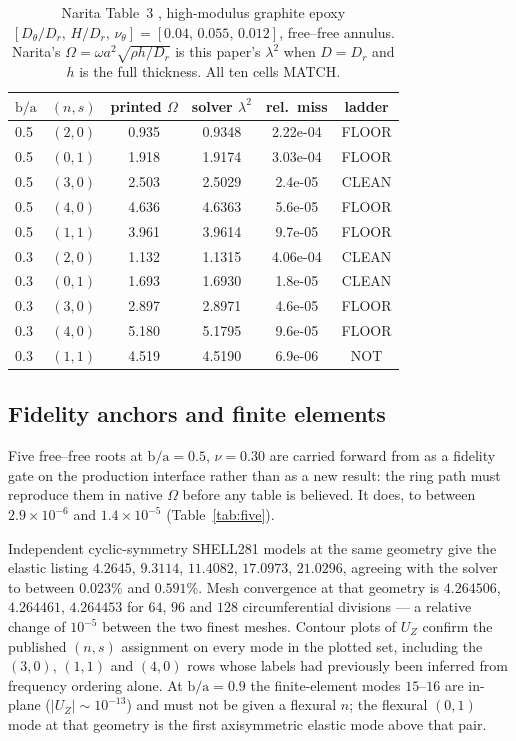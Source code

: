 \documentclass[11pt]{article}
\newcommand{\lamsq}{\lambda^{2}}
\newcommand{\ba}{\mbox{b/a}}
\begin{document}
\begin{table}[htbp]\centering\small
\caption{Narita Table~3 \cite{narita1984}, high-modulus graphite epoxy
$[D_\theta/D_r,\,H/D_r,\,\nu_\theta]=[0.04,\,0.055,\,0.012]$, free--free
annulus. Narita's $\Omega=\omega a^{2}\sqrt{\rho h/D_r}$ is this paper's
$\lamsq$ when $D=D_r$ and $h$ is the full thickness. All ten cells MATCH.}
\label{tab:narita3}
\begin{tabular}{lccccc}
\toprule
$\ba$ & $(n,s)$ & printed $\Omega$ & solver $\lamsq$ & rel.\ miss & ladder\\
\midrule
0.5 & $(2,0)$ & 0.935 & 0.9348 & 2.22e-04 & FLOOR \\
0.5 & $(0,1)$ & 1.918 & 1.9174 & 3.03e-04 & FLOOR \\
0.5 & $(3,0)$ & 2.503 & 2.5029 & 2.4e-05 & CLEAN \\
0.5 & $(4,0)$ & 4.636 & 4.6363 & 5.6e-05 & FLOOR \\
0.5 & $(1,1)$ & 3.961 & 3.9614 & 9.7e-05 & FLOOR \\
0.3 & $(2,0)$ & 1.132 & 1.1315 & 4.06e-04 & CLEAN \\
0.3 & $(0,1)$ & 1.693 & 1.6930 & 1.8e-05 & CLEAN \\
0.3 & $(3,0)$ & 2.897 & 2.8971 & 4.6e-05 & FLOOR \\
0.3 & $(4,0)$ & 5.180 & 5.1795 & 9.6e-05 & FLOOR \\
0.3 & $(1,1)$ & 4.519 & 4.5190 & 6.9e-06 & NOT \\
\bottomrule
\end{tabular}
\end{table}

\subsection{Fidelity anchors and finite elements}\label{sec:ff-fe}
Five free--free roots at $\ba=0.5$, $\nu=0.30$ are carried forward from
\cite{mccune2026annular} as a fidelity gate on the production interface rather
than as a new result: the ring path must reproduce them in native $\Omega$
before any table is believed. It does, to between $2.9\times10^{-6}$ and
$1.4\times10^{-5}$ (Table~\ref{tab:five}).

Independent cyclic-symmetry SHELL281 models at the same geometry give the
elastic listing $4.2645$, $9.3114$, $11.4082$, $17.0973$, $21.0296$, agreeing
with the solver to between $0.023\%$ and $0.591\%$. Mesh convergence at that
geometry is $4.264506$, $4.264461$, $4.264453$ for $64$, $96$ and $128$
circumferential divisions --- a relative change of $10^{-5}$ between the two
finest meshes. Contour plots of $U_Z$ confirm the published $(n,s)$
assignment on every mode in the plotted set, including the $(3,0)$, $(1,1)$
and $(4,0)$ rows whose labels had previously been inferred from frequency
ordering alone. At $\ba=0.9$ the finite-element modes $15$--$16$ are in-plane
($|U_Z|\sim10^{-13}$) and must not be given a flexural $n$; the flexural
$(0,1)$ mode at that geometry is the first axisymmetric elastic mode above
that pair.
\end{document}
